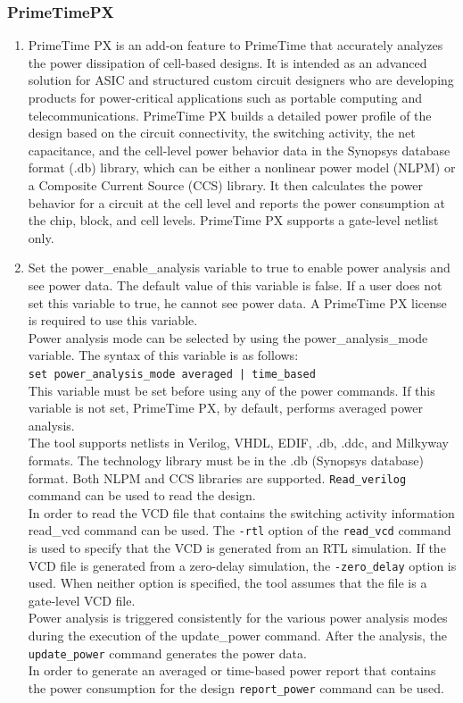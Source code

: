 \documentclass[a4paper,12pt,twoside]{article}
\begin{document}
\subsubsection{PrimeTimePX}
\begin{enumerate}
    \item PrimeTime PX is an add-on feature to PrimeTime that accurately analyzes the power dissipation of cell-based designs. It is intended as an advanced solution for ASIC and structured custom circuit designers who are developing products for power-critical applications such as portable computing and telecommunications. PrimeTime PX builds a detailed power profile of the design based on the circuit connectivity, the switching activity, the net capacitance, and the cell-level power behavior data in the Synopsys database format (.db) library, which can be either a nonlinear power model (NLPM) or a Composite Current Source (CCS) library. It then calculates the power behavior for a circuit at the cell level and reports the power consumption at the chip, block, and cell levels. PrimeTime PX supports a gate-level netlist only.
    \item Set the power\_enable\_analysis variable to true to enable power analysis and see power data. The default value of this variable is false. If a user does not set this variable to true, he cannot see power data. A PrimeTime PX license is required to use this variable.\\
    Power analysis mode can be selected by using the power\_analysis\_mode variable. The syntax of this variable is as follows:\\
    \texttt{set power\_analysis\_mode averaged | time\_based}\\
    This variable must be set before using any of the power commands. If this variable is not set, PrimeTime PX, by default, performs averaged power analysis.\\
    The tool supports netlists in Verilog, VHDL, EDIF, .db, .ddc, and Milkyway formats. The technology library must be in the .db (Synopsys database) format. Both NLPM and CCS libraries are supported. \texttt{Read\_verilog} command can be used to read the design.\\
    In order to read the VCD file that contains the switching activity information read\_vcd command can be used. The \texttt{-rtl} option of the \texttt{read\_vcd} command is used to specify that the VCD is generated from an RTL simulation. If the VCD file is generated from a zero-delay simulation, the \texttt{-zero\_delay} option is used. When neither option is specified, the tool assumes that the file is a gate-level VCD file.\\
    Power analysis is triggered consistently for the various power analysis modes during the execution of the update\_power command. After the analysis, the \texttt{update\_power} command generates the power data.\\
    In order to generate an averaged or time-based power report that contains the power consumption for the design \texttt{report\_power} command can be used.
\end{enumerate}
\end{document}
